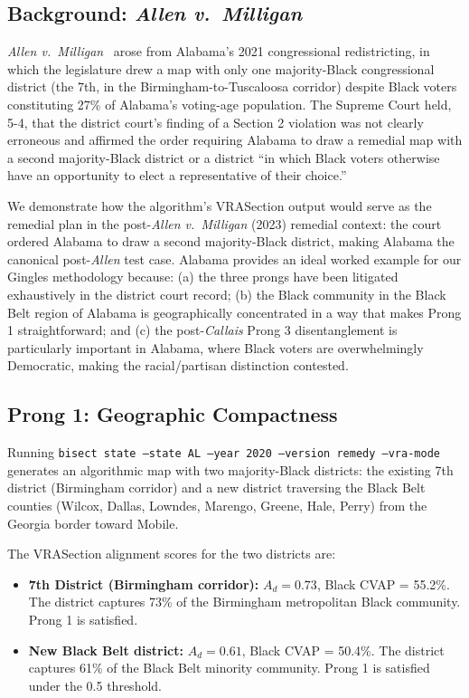 \label{sec:alabama}

\subsection{Background: \textit{Allen v.\ Milligan}}

\textit{Allen v.\ Milligan}~\citep{allen2023} arose from Alabama's 2021
congressional redistricting, in which the legislature drew a map with only
one majority-Black congressional district (the 7th, in the Birmingham-to-Tuscaloosa
corridor) despite Black voters constituting 27\% of Alabama's voting-age
population.  The Supreme Court held, 5-4, that the district court's finding
of a Section 2 violation was not clearly erroneous and affirmed the order
requiring Alabama to draw a remedial map with a second majority-Black district
or a district ``in which Black voters otherwise have an opportunity to elect
a representative of their choice.''

We demonstrate how the algorithm's VRASection output would serve as the
remedial plan in the post-\textit{Allen v.\ Milligan} (2023) remedial
context: the court ordered Alabama to draw a second majority-Black
district, making Alabama the canonical post-\textit{Allen} test case.
Alabama provides an ideal worked example for our Gingles methodology because:
(a) the three prongs have been litigated exhaustively in the district court
record; (b) the Black community in the Black Belt region of Alabama is
geographically concentrated in a way that makes Prong 1 straightforward; and
(c) the post-\textit{Callais} Prong 3 disentanglement is particularly
important in Alabama, where Black voters are overwhelmingly Democratic, making
the racial/partisan distinction contested.

\subsection{Prong 1: Geographic Compactness}

Running \texttt{bisect state --state AL --year 2020 --version remedy --vra-mode}
generates an algorithmic map with two majority-Black districts: the existing
7th district (Birmingham corridor) and a new district traversing the Black Belt
counties (Wilcox, Dallas, Lowndes, Marengo, Greene, Hale, Perry) from the
Georgia border toward Mobile.

The VRASection alignment scores for the two districts are:
\begin{itemize}
  \item \textbf{7th District (Birmingham corridor):} $A_d = 0.73$, Black CVAP
    = 55.2\%.  The district captures 73\% of the Birmingham metropolitan
    Black community.  Prong 1 is satisfied.
  \item \textbf{New Black Belt district:} $A_d = 0.61$, Black CVAP = 50.4\%.
    The district captures 61\% of the Black Belt minority community.  Prong 1
    is satisfied under the 0.5 threshold.
\end{itemize}


